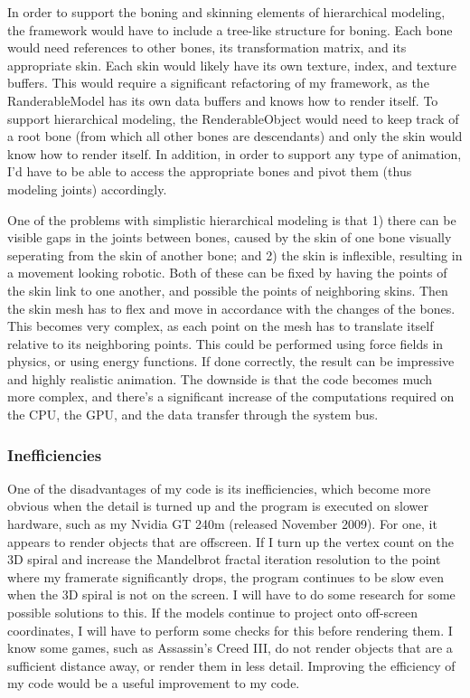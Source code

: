 \documentclass[journal]{IEEEtran}
\begin{document}
In order to support the boning and skinning elements of hierarchical modeling, the framework would have to include a tree-like structure for boning. Each bone would need references to other bones, its transformation matrix, and its appropriate skin. Each skin would likely have its own texture, index, and texture buffers. This would require a significant refactoring of my framework, as the RanderableModel has its own data buffers and knows how to render itself. To support hierarchical modeling, the RenderableObject would need to keep track of a root bone (from which all other bones are descendants) and only the skin would know how to render itself. In addition, in order to support any type of animation, I'd have to be able to access the appropriate bones and pivot them (thus modeling joints) accordingly.

One of the problems with simplistic hierarchical modeling is that 1) there can be visible gaps in the joints between bones,  caused by the skin of one bone visually seperating from the skin of another bone; and 2) the skin is inflexible, resulting in a movement looking robotic. Both of these can be fixed by having the points of the skin link to one another, and possible the points of neighboring skins. Then the skin mesh has to flex and move in accordance with the changes of the bones. This becomes very complex, as each point on the mesh has to translate itself relative to its neighboring points. This could be performed using force fields in physics, or using energy functions. If done correctly, the result can be impressive and highly realistic animation. The downside is that the code becomes much more complex, and there's a significant increase of the computations required on the CPU, the GPU, and the data transfer through the system bus.

\subsubsection{Inefficiencies}

One of the disadvantages of my code is its inefficiencies, which become more obvious when the detail is turned up and the program is executed on slower hardware, such as my Nvidia GT 240m (released November 2009). For one, it appears to render objects that are offscreen. If I turn up the vertex count on the 3D spiral and increase the Mandelbrot fractal iteration resolution to the point where my framerate significantly drops, the program continues to be slow even when the 3D spiral is not on the screen. I will have to do some research for some possible solutions to this. If the models continue to project onto off-screen coordinates, I will have to perform some checks for this before rendering them. I know some games, such as Assassin's Creed III, do not render objects that are a sufficient distance away, or render them in less detail. Improving the efficiency of my code would be a useful improvement to my code.
\end{document}
